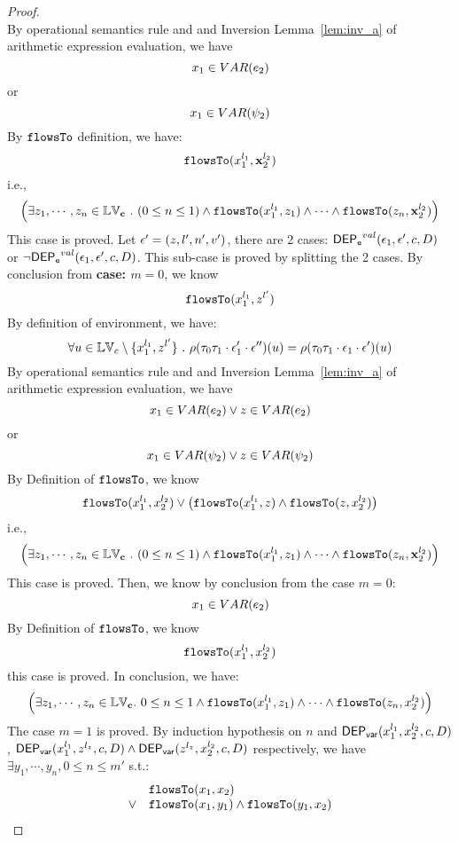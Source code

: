 \begin{proof}
\[\]
By operational semantics rule  and  and {Inversion Lemma~\ref{lem:inv_a}} of arithmetic expression evaluation, we have 
\[
  x_1 \in VAR(e_2) 
\]
or
\[
  x_1 \in VAR(\psi_2)
\]
%
By $\mathtt{flowsTo}$ definition, we have:
%
\[
\mathtt{flowsTo}(x_1^{l_1}, {\boldsymbol{\mathbf{x}}}_2^{l_2})
\]
i.e.,
%
\[
 \Big( \exists z_1, \cdots, z_n \in \mathbb{LV}_{{\boldsymbol{\mathbf{c}}}} ~.~ (0 \leq n \leq 1 )
 \land \mathtt{flowsTo}(x_1^{l_1}, z_1) \land \cdots \land \mathtt{flowsTo}(z_n, {\boldsymbol{\mathbf{x}}}_2^{l_2}) \Big)
\]
%
This case is proved.
%
%
Let $\mathtt{\epsilon}' = (z, l', n', v')$, there are 2 cases:
%
$\mathsf{DEP_{\mathtt{e}}}^{val}(\mathtt{\epsilon}_1, \mathtt{\epsilon}', c, D)$ or $\neg \mathsf{DEP_{\mathtt{e}}}^{val}(\mathtt{\epsilon}_1, \mathtt{\epsilon}', c, D)$.
%
This sub-case is proved by splitting the 2 cases.
%
%
By conclusion from \textbf{case: $m = 0$}, we know
\[
  \mathtt{flowsTo}(x_1^{l_1}, z^{l'})
\]
%
By definition of environment, we have:
\[
  \forall u \in \mathbb{LV}_c \setminus \{x_1^{l_1}, z^{l'}\} ~.~
  \rho(\mathtt{\tau}_0 \mathtt{\tau}_1 \cdot \mathtt{\epsilon}_1' \cdot \mathtt{\epsilon}'') (u) =  
  \rho(\mathtt{\tau}_0 \mathtt{\tau}_1 \cdot \mathtt{\epsilon}_1 \cdot \mathtt{\epsilon}') (u)
\]
By operational semantics rule  and  and {Inversion Lemma~\ref{lem:inv_a}} of arithmetic expression evaluation, we have 
\[
  x_1 \in VAR(e_2) \lor z \in VAR(e_2)
\]
or
\[
  x_1 \in VAR(\psi_2) \lor z \in VAR(\psi_2)
\]
%
By Definition of $\mathtt{flowsTo}$, we know
\[
  \mathtt{flowsTo}(x_1^{l_1}, x_2^{l_2}) \lor 
  \big(\mathtt{flowsTo}(x_1^{l_1}, z) \land \mathtt{flowsTo}(z, x_2^{l_2}) \big)
\]
%
i.e.,
%
\[
 \Big( \exists z_1, \cdots, z_n \in \mathbb{LV}_{{\boldsymbol{\mathbf{c}}}} ~.~ (0 \leq n \leq 1 )
 \land \mathtt{flowsTo}(x_1^{l_1}, z_1) \land \cdots \land \mathtt{flowsTo}(z_n, {\boldsymbol{\mathbf{x}}}_2^{l_2}) \Big)
\]
%
This case is proved.
%
Then, we know by conclusion from the case $m = 0$:
\[
  x_1 \in VAR(e_2)
\]
%
By Definition of $\mathtt{flowsTo}$, we know
\[
  \mathtt{flowsTo}(x_1^{l_1}, x_2^{l_2}) 
\]
this case is proved.
%
In conclusion, we have:
\[
  \Big( \exists z_1, \cdots, z_n \in \mathbb{LV}_{{\boldsymbol{\mathbf{c}}}}. ~ 0 \leq n \leq 1 \land
  \mathtt{flowsTo}(x_1^{l_1}, z_1) 
  \land \cdots \land \mathtt{flowsTo}(z_n, x_2^{l_2}) \Big)
\]
The case $m = 1$ is proved.
%
By induction hypothesis on $n$ and $\mathsf{DEP_{var}}(x_1^{l_1}, x_2^{l_2}, c, D)$, 
$\mathsf{DEP_{var}}(x_1^{l_1}, z^{l_z}, c, D) \land \mathsf{DEP_{var}}(z^{l_z}, x_2^{l_2}, c, D)$ respectively, 
we have $\exists y_1, \cdots, y_n, 0 \leq n \leq m'$ s.t.:
\[
\begin{array}{ll}
      & \mathtt{flowsTo}(x_1, x_2) \\
  \lor  & \mathtt{flowsTo}(x_1, y_1) \land \mathtt{flowsTo}(y_1, x_2)\\

\end{array}\]
\end{proof}
